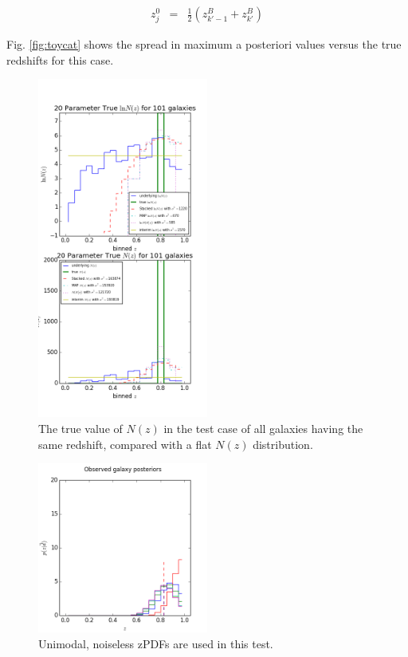 \documentclass[preprint]{aastex}
\begin{document}
\begin{eqnarray}
\label{eq:fakez}
z^{0}_{j} &=& \frac{1}{2}(z_{k'-1}^{B}+z_{k'}^{B})
\end{eqnarray}

Fig. \ref{fig:toycat} shows the spread in maximum a posteriori values versus the true redshifts for this case.

\begin{figure}
\includegraphics[width=0.5\textwidth]{toy/trueNz.png}
\caption{The true value of $N(z)$ in the test case of all galaxies having the same redshift, compared with a flat $N(z)$ distribution.}
\label{fig:deltatrueNz}
\end{figure}

\begin{figure}
\includegraphics[width=0.5\textwidth]{toy/samplepzs.png}
\caption{Unimodal, noiseless zPDFs are used in this test.}
\label{fig:toypzs}
\end{figure}
\end{document}
